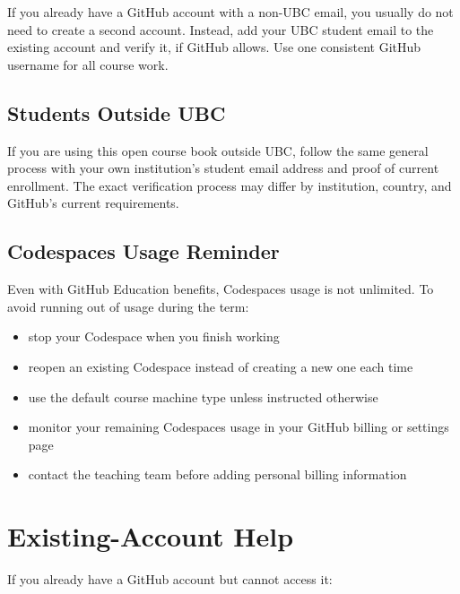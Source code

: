 \documentclass[
  letterpaper,
  DIV=11,
  numbers=noendperiod,
  oneside]{scrreprt}
\providecommand{\tightlist}{%
  \setlength{\itemsep}{0pt}\setlength{\parskip}{0pt}}
\begin{document}
If you already have a GitHub account with a non-UBC email, you usually
do not need to create a second account. Instead, add your UBC student
email to the existing account and verify it, if GitHub allows. Use one
consistent GitHub username for all course work.

\subsection*{Students Outside UBC}\label{students-outside-ubc}

If you are using this open course book outside UBC, follow the same
general process with your own institution's student email address and
proof of current enrollment. The exact verification process may differ
by institution, country, and GitHub's current requirements.

\subsection*{Codespaces Usage Reminder}\label{codespaces-usage-reminder}

Even with GitHub Education benefits, Codespaces usage is not unlimited.
To avoid running out of usage during the term:

\begin{itemize}
\tightlist
\item
  stop your Codespace when you finish working
\item
  reopen an existing Codespace instead of creating a new one each time
\item
  use the default course machine type unless instructed otherwise
\item
  monitor your remaining Codespaces usage in your GitHub billing or
  settings page
\item
  contact the teaching team before adding personal billing information
\end{itemize}

\section*{Existing-Account Help}\label{existing-account-help}


If you already have a GitHub account but cannot access it:
\end{document}
